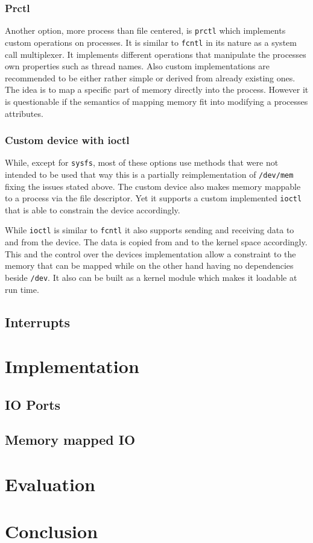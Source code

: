 \documentclass[
a4paper,
12pt,
notitlepage,
parskip=half,
DIV=11,
]{scrbook}
\begin{document}
		\subsection{Prctl}
		
		Another option, more process than file centered, is \texttt{prctl} which implements custom operations on processes.
		It is similar to \texttt{fcntl} in its nature as a system call multiplexer.
		It implements different operations that manipulate the processes own properties such as thread names.
		Also custom implementations are recommended to be either rather simple or derived from already existing ones.
		The idea is to map a specific part of memory directly into the process.
		However it is questionable if the semantics of mapping memory fit into modifying a processes attributes. \citep{syscall} \citep{prctl}
		
		\subsection{Custom device with ioctl}
		
		While, except for \texttt{sysfs}, most of these options use methods that were not intended to be used that way this is a partially reimplementation of \texttt{/dev/mem} fixing the issues stated above.
		The custom device also makes memory mappable to a process via the file descriptor.
		Yet it supports a custom implemented \texttt{ioctl} that is able to constrain the device accordingly.
		
		While \texttt{ioctl} is similar to \texttt{fcntl} it also supports sending and receiving data to and from the device.
		The data is copied from and to the kernel space accordingly.
		This and the control over the devices implementation allow a constraint to the memory that can be mapped while on the other hand having no dependencies beside \texttt{/dev}.
		It also can be built as a kernel module which makes it loadable at run time. \citep{ioctl}
		
		\section{Interrupts}
		
		
	\chapter{Implementation}
	
	\section{IO Ports}
	
	\section{Memory mapped IO}
	
	
	\chapter{Evaluation}
	\chapter{Conclusion}
	
	
	
	
\end{document}
